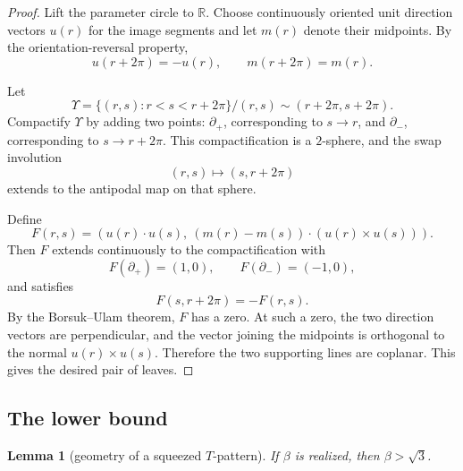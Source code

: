 \documentclass[12pt]{article}
\newtheorem{lemma}[theorem]{Lemma}
\newcommand{\R}{\mathbb R}
\begin{document}
\begin{proof}
Lift the parameter circle to \(\R\).  Choose continuously oriented unit direction vectors \(u(r)\) for the image segments and let \(m(r)\) denote their midpoints.  By the orientation-reversal property,
\[
u(r+2\pi)=-u(r),\qquad m(r+2\pi)=m(r).
\]

Let
\[
\Upsilon=\{(r,s): r<s<r+2\pi\}/(r,s)\sim(r+2\pi,s+2\pi).
\]
Compactify \(\Upsilon\) by adding two points: \(\partial_+\), corresponding to \(s\to r\), and \(\partial_-\), corresponding to \(s\to r+2\pi\).  This compactification is a \(2\)-sphere, and the swap involution
\[
(r,s)\longmapsto (s,r+2\pi)
\]
extends to the antipodal map on that sphere.

Define
\[
F(r,s)=\left(u(r)\cdot u(s),\ (m(r)-m(s))\cdot (u(r)\times u(s))\right).
\]
Then \(F\) extends continuously to the compactification with
\[
F(\partial_+)=(1,0),\qquad F(\partial_-)=(-1,0),
\]
and satisfies
\[
F(s,r+2\pi)=-F(r,s).
\]
By the Borsuk--Ulam theorem, \(F\) has a zero.  At such a zero, the two direction vectors are perpendicular, and the vector joining the midpoints is orthogonal to the normal \(u(r)\times u(s)\).  Therefore the two supporting lines are coplanar.  This gives the desired pair of leaves.
\end{proof}

\subsection{The lower bound}

\begin{lemma}[geometry of a squeezed \(T\)-pattern]
If \(\beta\) is realized, then \(\beta>\sqrt 3\).
\end{lemma}
\end{document}
